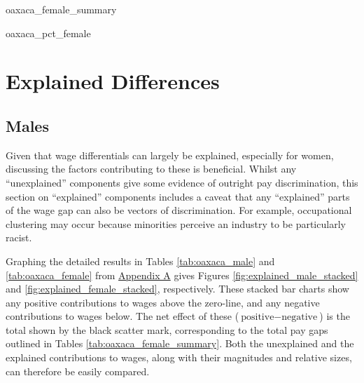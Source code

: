 \documentclass[class=article, crop=false]{standalone}
\begin{document}
{oaxaca_female_summary}

{oaxaca_pct_female}


\section{Explained Differences}
\label{sec:explained_diff}
\subsection{Males}
\label{sec:male_explained}
Given that wage differentials can largely be explained, especially for women, discussing the factors contributing to these is beneficial. Whilst any \enquote{unexplained} components give some evidence of outright pay discrimination, this section on \enquote{explained} components includes a caveat that any \enquote{explained} parts of the wage gap can also be vectors of discrimination. For example, occupational clustering may occur because minorities perceive an industry to be particularly racist. 

Graphing the detailed results in Tables \ref{tab:oaxaca_male} and \ref{tab:oaxaca_female} from \hyperref[sec:appendixA]{Appendix A} gives Figures \ref{fig:explained_male_stacked} and \ref{fig:explained_female_stacked}, respectively. These stacked bar charts show any positive contributions to wages above the zero-line, and any negative contributions to wages below. The net effect of these ($\text{positive}-\text{negative}$) is the total shown by the black scatter mark, corresponding to the total pay gaps outlined in Tables \ref{tab:oaxaca_female_summary}. Both the unexplained and the explained contributions to wages, along with their magnitudes and relative sizes, can therefore be easily compared.
\end{document}
